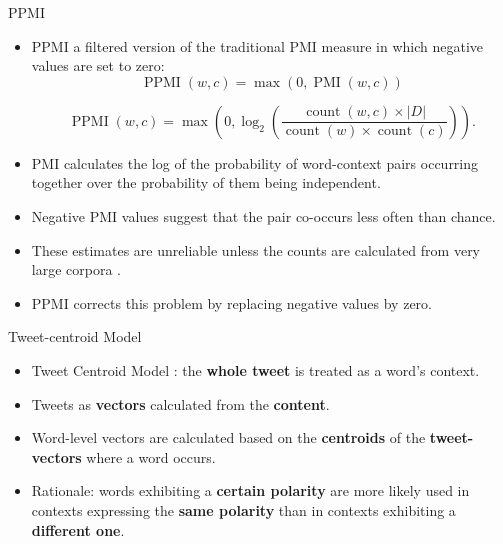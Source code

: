 \begin{frame}{PPMI}
\begin{scriptsize}
\begin{itemize}
\item PPMI a filtered version of the traditional PMI measure in which negative values are set to zero:
\begin{equation}
 \operatorname{PPMI}(w, c)= \operatorname{max}(0,\operatorname{PMI}(w, c))
\end{equation}

\begin{equation}
 \operatorname{PPMI}(w,c)= \max \left (0, \log_{2} \left ( \frac{\operatorname{count}(w,c)\times |D|}{\operatorname{count}(w)\times \operatorname{count}(c)} \right )\right ). 
\end{equation}
\item  PMI calculates the log of the probability of word-context pairs occurring together over the probability of them being independent. 
\item Negative PMI values suggest that the pair co-occurs less often than chance. 
\item These estimates are unreliable unless the counts are calculated from very large corpora \cite{JurafskyBook}.
\item  PPMI corrects this problem by replacing negative values by zero. 
\end{itemize}
\end{scriptsize}
\end{frame}




\begin{frame}{Tweet-centroid Model}
\begin{scriptsize}
\begin{itemize}
\item Tweet Centroid Model \cite{Bravo-Marquez2015}: the \textbf{whole tweet} is treated as a word's context.
\item Tweets as \textbf{vectors} calculated from the \textbf{content}.
\item Word-level vectors are calculated based on the \textbf{centroids} of the \textbf{tweet-vectors} where a word occurs.
\item Rationale: words exhibiting a \textbf{certain polarity} are more likely used in contexts expressing the \textbf{same polarity} than in contexts exhibiting a \textbf{different one}. 
\end{itemize}
\end{scriptsize}
\end{frame}




